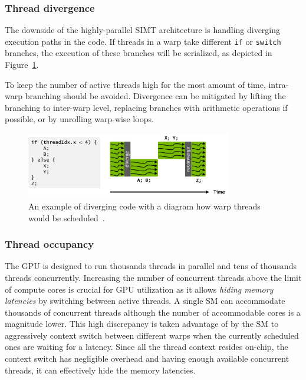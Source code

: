 \subsubsection{Thread divergence}
\label{sec:divergence}

The downside of the highly-parallel SIMT architecture is handling diverging execution paths in the code. If threads in a warp take different \texttt{if} or \texttt{switch} branches, the execution of these branches will be serialized, as depicted in Figure~\ref{fig:divergence}.

To keep the number of active threads high for the most amount of time, intra-warp branching should be avoided. Divergence can be mitigated by lifting the branching to inter-warp level, replacing branches with arithmetic operations if possible, or by unrolling warp-wise loops.

\begin{figure}
    \centering
    \includegraphics[width=0.8\textwidth]{img/divergence.png}
    \caption{An example of diverging code with a diagram how warp threads would be scheduled~\cite{site:volta}.}
    \label{fig:divergence}
\end{figure}

\subsubsection{Thread occupancy}
\label{sec:occupancy}

The GPU is designed to run thousands threads in parallel and tens of thousands threads concurrently. Increasing the number of concurrent threads above the limit of compute cores is crucial for GPU utilization as it allows \emph{hiding memory latencies} by switching between active threads. A single SM can accommodate thousands of concurrent threads although the number of accommodable cores is a magnitude lower. This high discrepancy is taken advantage of by the SM to aggressively context switch between different warps when the currently scheduled ones are waiting for a latency. Since all the thread context resides on-chip, the context switch has negligible overhead and having enough available concurrent threads, it can effectively hide the memory latencies.

